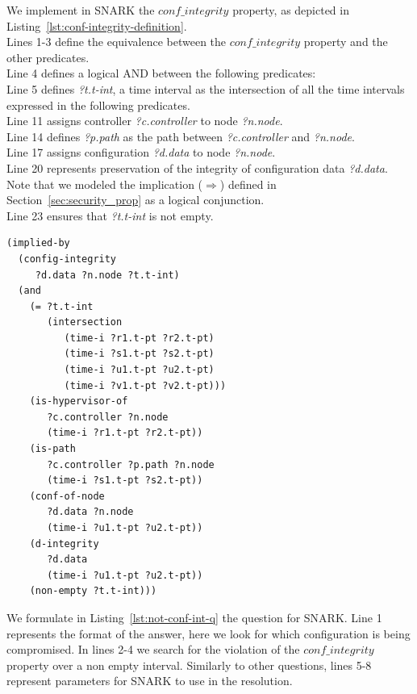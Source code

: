 We implement in SNARK the $conf\_integrity$ property, as depicted in Listing~\ref{lst:conf-integrity-definition}.\\
Lines 1-3 define the equivalence between the $conf\_integrity$ property and the other predicates.\\
Line 4 defines a logical AND between the following predicates:\\
Line 5 defines \textit{?t.t-int}, a time interval as the intersection of all the time intervals expressed in the following predicates.\\
Line 11 assigns controller \textit{?c.controller} to node \textit{?n.node}.\\
Line 14 defines \textit{?p.path} as the path between \textit{?c.controller} and \textit{?n.node}.\\
Line 17 assigns configuration \textit{?d.data} to node \textit{?n.node}.\\
Line 20 represents preservation of the integrity of configuration data \textit{?d.data}.\\
Note that we modeled the implication ($\Rightarrow$) defined in Section~\ref{sec:security_prop} as a logical conjunction.\\
Line 23 ensures that \textit{?t.t-int} is not empty.

\begin{lstlisting}[caption=SNARK definition of the configuration integrity., label=lst:conf-integrity-definition,captionpos=b] 
(implied-by
  (config-integrity 
     ?d.data ?n.node ?t.t-int)
  (and
    (= ?t.t-int
       (intersection
    	  (time-i ?r1.t-pt ?r2.t-pt)
    	  (time-i ?s1.t-pt ?s2.t-pt)
    	  (time-i ?u1.t-pt ?u2.t-pt)
    	  (time-i ?v1.t-pt ?v2.t-pt)))
    (is-hypervisor-of
       ?c.controller ?n.node 
       (time-i ?r1.t-pt ?r2.t-pt))
    (is-path 
	   ?c.controller ?p.path ?n.node
       (time-i ?s1.t-pt ?s2.t-pt))
    (conf-of-node
	   ?d.data ?n.node
       (time-i ?u1.t-pt ?u2.t-pt))
    (d-integrity
	   ?d.data
       (time-i ?u1.t-pt ?u2.t-pt))
    (non-empty ?t.t-int)))

\end{lstlisting}

We formulate in Listing~\ref{lst:not-conf-int-q} the question for SNARK.
Line 1 represents the format of the answer, here we look for which configuration is being compromised. In lines 2-4 we search for the violation of the $conf\_integrity$ property over a non empty interval. Similarly to other questions, lines 5-8 represent parameters for SNARK to use in the resolution.


